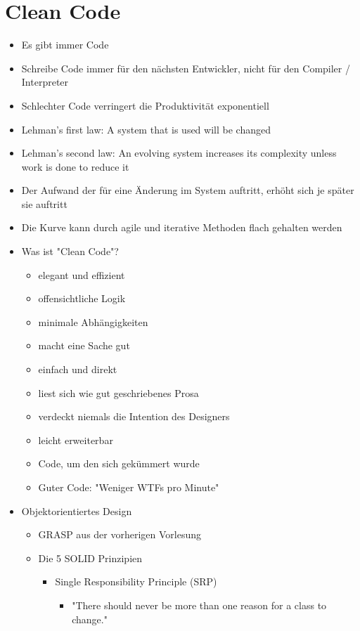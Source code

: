 \documentclass[paper=a4, fontsize=11pt]{scrartcl} %
\numberwithin{equation}{section} %
\numberwithin{figure}{section} %
\numberwithin{table}{section} %
\begin{document}
\section{Clean Code}

\begin{itemize}
  \item Es gibt immer Code
  \item Schreibe Code immer für den nächsten Entwickler, nicht für den Compiler / Interpreter
  \item Schlechter Code verringert die Produktivität exponentiell
  \item Lehman's first law: A system that is used will be changed
  \item Lehman's second law: An evolving system increases its complexity unless work is done to reduce it
  \item Der Aufwand der für eine Änderung im System auftritt, erhöht sich je später sie auftritt
  \item Die Kurve kann durch agile und iterative Methoden flach gehalten werden
  \item Was ist "Clean Code"?
  \begin{itemize}
    \item elegant und effizient
    \item offensichtliche Logik
    \item minimale Abhängigkeiten
    \item macht eine Sache gut
    \item einfach und direkt
    \item liest sich wie gut geschriebenes Prosa
    \item verdeckt niemals die Intention des Designers
    \item leicht erweiterbar
    \item Code, um den sich gekümmert wurde
    \item Guter Code: "Weniger WTFs pro Minute"
  \end{itemize}
  \item Objektorientiertes Design
  \begin{itemize}
    \item GRASP aus der vorherigen Vorlesung
    \item Die 5 SOLID Prinzipien
    \begin{itemize}
      \item Single Responsibility Principle (SRP)
      \begin{itemize}
        \item "There should never be more than one reason for a class to change."

\end{itemize}
\end{itemize}
\end{itemize}
\end{itemize}
\end{document}
